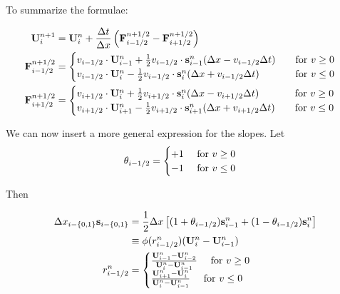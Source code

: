 To summarize the formulae:

\begin{align*}
	\mathbf{U}_i ^{n+1} &= 
		\mathbf{U}_i^{n} +  \frac{\Delta t}{\Delta x} \left( \mathbf{F}_{i-1/2}^{n+1/2} - \mathbf{F}_{i+1/2}^{n+1/2} \right) & \\
	\mathbf{F}_{i-1/2}^{n+1/2} &= 
		\begin{cases}
			v_{i-1/2} \cdot \mathbf{U}_{i-1}^n +  \frac{1}{2} v_{i-1/2} \cdot\mathbf{s}_{i-1}^n (\Delta x -  v_{i-1/2} \Delta t)
			 	& \quad \text{for } v \geq 0 \\
			v_{i-1/2} \cdot \mathbf{U}_{i}^n -\frac{1}{2} v_{i-1/2} \cdot \mathbf{s}_{i}^n (\Delta x + v_{i-1/2} \Delta t)
				& \quad \text{for } v \leq 0 \\
		\end{cases} \\
	\mathbf{F}_{i+1/2}^{n+1/2} &= 
		\begin{cases}
			v_{i+1/2} \cdot \mathbf{U}_{i}^n +  \frac{1}{2} v_{i+1/2} \cdot\mathbf{s}_{i}^n (\Delta x -  v_{i+1/2} \Delta t)
			 	& \quad \text{for } v \geq 0 \\
			v_{i+1/2} \cdot \mathbf{U}_{i+1}^n -\frac{1}{2} v_{i+1/2} \cdot \mathbf{s}_{i+1}^n (\Delta x + v_{i+1/2} \Delta t)
				& \quad \text{for } v \leq 0 \\
		\end{cases} \\		
\end{align*}





We can now insert a more general expression for the slopes.
Let 
\begin{align}
	\theta_{i-1/2} = \begin{cases} +1 \quad \text{ for } v \geq 0 \\ -1 \quad  \text{ for } v \leq{0} \end{cases}
\end{align}

Then

\begin{align}
	\Delta x_{i-\{0, 1\}} \mathbf{s}_{i-\{0,1\}} 
		&= \frac{1}{2} \Delta x \left[ (1 + \theta_{i-1/2}) \mathbf{s}_{i-1}^n + (1 - \theta_{i-1/2})  \mathbf{s}_{i}^n \right]  \\
	&\equiv \phi(r_{i-1/2}^n) (\mathbf{U}_i^n - \mathbf{U}_{i-1}^n ) \\
	r^n_{i-1/2} &= \begin{cases}
		\frac{\mathbf{U}_{i-1}^n - \mathbf{U}_{i-2}^n}{\mathbf{U}_{i}^n - \mathbf{U}_{i-1}^n} 	\quad \text{ for } v  \geq 0 \\
		\frac{\mathbf{U}_{i+1}^n - \mathbf{U}_{i}^n}{\mathbf{U}_{i}^n - \mathbf{U}_{i-1}^n} 	\quad \text{ for } v  \leq 0 \\
	\end{cases} 
\end{align}

